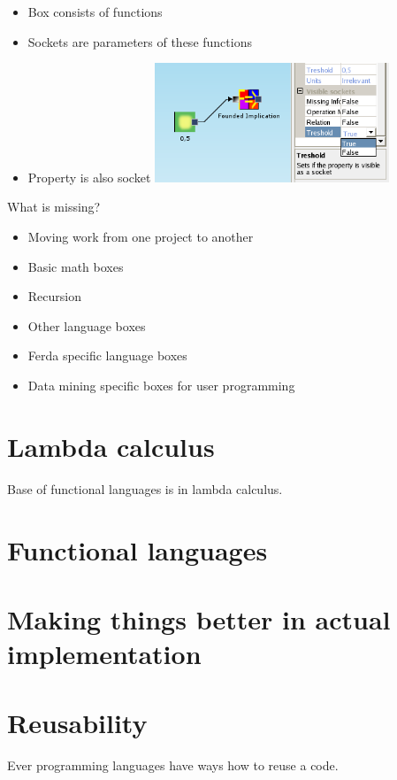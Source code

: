 \documentclass{article}
\begin{document}
\begin{itemize}
	\item Box consists of functions
	\item Sockets are parameters of these functions
	\item Property is also socket
		\includegraphics[width=7cm]{property_as_socket}
\end{itemize}

What is missing?
\begin{itemize}
	\item Moving work from one project to another
	\item Basic math boxes
	\item Recursion
	\item Other language boxes
	\item Ferda specific language boxes
	\item Data mining specific boxes for user programming
\end{itemize}

\section{Lambda calculus}
Base of functional languages is in lambda calculus. 

\section{Functional languages}

\section{Making things better in actual implementation}
\section{Reusability}
Ever programming languages have ways how to reuse a code. 
\end{document}
